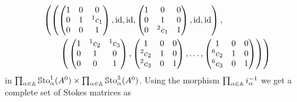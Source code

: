 \begin{align*}
  &\left(
  \left(
    \begin{pmatrix} 1 & 0 & 0 \\0 & 1 & {}^1c_1 \\0 & 0 & 1 \end{pmatrix},
    \operatorname{id},\operatorname{id},
    \begin{pmatrix} 1 & 0 & 0 \\0 & 1 & 0 \\0 & {}^2c_1 & 1 \end{pmatrix},
    \operatorname{id},\operatorname{id}
  \right),
  \right.
\\&\qquad\left(
  \left.
    \begin{pmatrix} 1 & {}^1c_2 & {}^1c_3 \\0 & 1 & 0 \\0 & 0 & 1 \end{pmatrix},
    \begin{pmatrix} 1 & 0 & 0 \\{}^2c_2 & 1 & 0 \\{}^2c_3 & 0 & 1 \end{pmatrix},
    \dots,
    \begin{pmatrix} 1 & 0 & 0 \\{}^{6}c_2 & 1 & 0 \\{}^{6}c_3 & 0 & 1 \end{pmatrix}
  \right)
  \right)
\end{align*}
in
$\prod_{\alpha\in\mathbb{A}}\operatorname{\mathbb{S}to}_{\alpha}^{1}(A^0) \times
\prod_{\alpha\in\mathbb{A}}\operatorname{\mathbb{S}to}_{\alpha}^{3}(A^0)$.
Using the morphism $\prod_{\alpha\in\mathbb{A}}i_\alpha^{-1}$ we get a complete set of
Stokes matrices as
